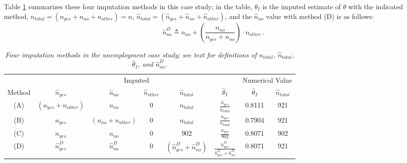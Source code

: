\documentclass[12pt]{article}
\begin{document}
\begin{itemize}
\begin{itemize}
\end{itemize}

Table \ref{t:imputation-1} summarizes these four imputation methods in this case study; in the table, $\hat{ \theta }_I$ is the imputed estimate of $\theta$ with the indicated method, $n_{ total } = ( n_{ yes } + n_{ no } + n_{ other } ) = n$, $\hat{ n }_{ total } = ( \hat{ n }_{ yes } + \hat{ n }_{ no } + \hat{ n }_{ other } )$, and the $\hat{ n }_{ no }$ value with method (D) is as follows:
\begin{equation} \label{e:proportional-1}
\hat{ n }_{ no }^D \triangleq n_{ no } + \left( \frac{ n_{ no } }{ n_{ yes } + n_{ no } } \right) \cdot n_{ other } \, .
\end{equation}

\begin{table}[t!]

\centering

\caption{\textit{Four imputation methods in the unemployment case study; see text for definitions of $n_{ total }$, $\hat{ n }_{ total }$, $\hat{ \theta }_I$, and $\hat{ n }_{ no }^D$.}}

\label{t:imputation-1}

\bigskip

\begin{tabular}{c||ccccc||cc}

& \multicolumn{5}{c||}{Imputed} & \multicolumn{2}{c}{Numerical Value} \\ \cline{2-8}

\rule{0pt}{3ex} Method & $\hat{ n }_{ yes }$ & $\hat{ n }_{ no }$ & $\hat{ n }_{ other }$ & $\hat{ n }_{ total }$ & $\hat{ \theta }_I$ & $\hat{ \theta }_I$ & $\hat{ n }_{ total }$ \\ \hline 

\rule{0pt}{3ex} (A) & $( n_{ yes } + n_{ other } )$ & $n_{ no }$ & 0 & $n_{ total }$ & $\frac{\hat{n}_{yes}}{\hat{n}_{total}}$& 0.8111 & 921 \\

\rule{0pt}{3ex} (B) & $n_{yes}$ & $( n_{ no } + n_{ other } )$ & 0 & $n_{ total }$ & $\frac{ n_{ yes } }{ n_{ total } }$ &  0.7904& 921 \\

\rule{0pt}{3ex} (C) & $n_{ yes }$ &  $n_{ no }$& 0 & 902 & $\frac{n_{ yes}}{902}$ & 0.8071 & 902\\

\rule{0pt}{3ex} (D) & $\hat{n}_{yes}^{D}$ & $\hat{ n }_{ no }^D$ & 0 & $( \hat{ n }_{ yes }^D + \hat{ n }_{ no }^D )$ & $\frac{ \hat{ n }_{ yes }^D }{ \hat{ n }_{ yes }^D + \hat{ n }_{ no }^D }$ & 0.8071 & 921


\end{tabular}
\end{table}
\end{itemize}
\end{document}
